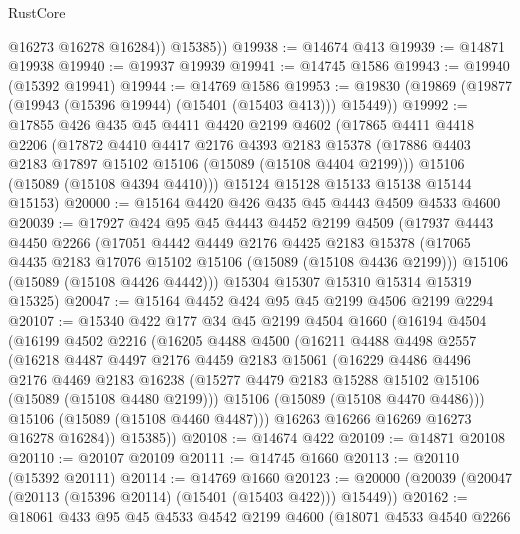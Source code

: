 \begin{lexlean}{RustCore}
\begin{coremodule}
            @16273
            @16278
            @16284))
        @15385))
@19938 := @14674 @413
@19939 := @14871 @19938
@19940 := @19937 @19939
@19941 := @14745 @1586
@19943 := @19940 (@15392 @19941)
@19944 := @14769 @1586
@19953 := @19830 (@19869 (@19877 (@19943 (@15396 @19944) (@15401 (@15403 @413))) @15449))
@19992 := @17855
    @426
    @435
    @45
    @4411
    @4420
    @2199
    @4602
    (@17865
      @4411
      @4418
      @2206
      (@17872
        @4410
        @4417
        @2176
        @4393
        @2183
        @15378
        (@17886 @4403 @2183 @17897 @15102 @15106 (@15089 (@15108 @4404 @2199)))
        @15106
        (@15089 (@15108 @4394 @4410)))
      @15124
      @15128
      @15133
      @15138
      @15144
      @15153)
@20000 := @15164 @4420 @426 @435 @45 @4443 @4509 @4533 @4600
@20039 := @17927
    @424
    @95
    @45
    @4443
    @4452
    @2199
    @4509
    (@17937
      @4443
      @4450
      @2266
      (@17051
        @4442
        @4449
        @2176
        @4425
        @2183
        @15378
        (@17065 @4435 @2183 @17076 @15102 @15106 (@15089 (@15108 @4436 @2199)))
        @15106
        (@15089 (@15108 @4426 @4442)))
      @15304
      @15307
      @15310
      @15314
      @15319
      @15325)
@20047 := @15164 @4452 @424 @95 @45 @2199 @4506 @2199 @2294
@20107 := @15340
    @422
    @177
    @34
    @45
    @2199
    @4504
    @1660
    (@16194
      @4504
      (@16199
        @4502
        @2216
        (@16205
          @4488
          @4500
          (@16211
            @4488
            @4498
            @2557
            (@16218
              @4487
              @4497
              @2176
              @4459
              @2183
              @15061
              (@16229
                @4486
                @4496
                @2176
                @4469
                @2183
                @16238
                (@15277 @4479 @2183 @15288 @15102 @15106 (@15089 (@15108 @4480 @2199)))
                @15106
                (@15089 (@15108 @4470 @4486)))
              @15106
              (@15089 (@15108 @4460 @4487)))
            @16263
            @16266
            @16269
            @16273
            @16278
            @16284))
        @15385))
@20108 := @14674 @422
@20109 := @14871 @20108
@20110 := @20107 @20109
@20111 := @14745 @1660
@20113 := @20110 (@15392 @20111)
@20114 := @14769 @1660
@20123 := @20000 (@20039 (@20047 (@20113 (@15396 @20114) (@15401 (@15403 @422))) @15449))
@20162 := @18061
    @433
    @95
    @45
    @4533
    @4542
    @2199
    @4600
    (@18071
      @4533
      @4540
      @2266

\end{coremodule}
\end{lexlean}
